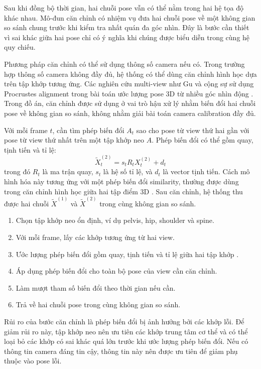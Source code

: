 \documentclass[../DoAn.tex]{subfiles}
\begin{document}
Sau khi đồng bộ thời gian, hai chuỗi pose vẫn có thể nằm trong hai hệ tọa độ khác nhau. Mô-đun căn chỉnh có nhiệm vụ đưa hai chuỗi pose về một không gian so sánh chung trước khi kiểm tra nhất quán đa góc nhìn. Đây là bước cần thiết vì sai khác giữa hai pose chỉ có ý nghĩa khi chúng được biểu diễn trong cùng hệ quy chiếu.

Phương pháp căn chỉnh có thể sử dụng thông số camera nếu có. Trong trường hợp thông số camera không đầy đủ, hệ thống có thể dùng căn chỉnh hình học dựa trên tập khớp tương ứng. Các nghiên cứu multi-view như Gu và cộng sự sử dụng Procrustes alignment trong bài toán ước lượng pose 3D từ nhiều góc nhìn động \cite{gu2024multiview}. Trong đồ án, căn chỉnh được sử dụng ở vai trò hậu xử lý nhằm biến đổi hai chuỗi pose về không gian so sánh, không nhằm giải bài toán camera calibration đầy đủ.

Với mỗi frame $t$, cần tìm phép biến đổi $A_t$ sao cho pose từ view thứ hai gần với pose từ view thứ nhất trên một tập khớp neo $A$. Phép biến đổi có thể gồm quay, tịnh tiến và tỉ lệ:
\[
\tilde{X}^{(2)}_t = s_t R_t X^{(2)}_t + d_t
\]
trong đó $R_t$ là ma trận quay, $s_t$ là hệ số tỉ lệ, và $d_t$ là vector tịnh tiến. Cách mô hình hóa này tương ứng với một phép biến đổi similarity, thường được dùng trong căn chỉnh hình học giữa hai tập điểm 3D \cite{gu2024multiview}. Sau căn chỉnh, hệ thống thu được hai chuỗi $\tilde{X}^{(1)}$ và $\tilde{X}^{(2)}$ trong cùng không gian so sánh.

\begin{enumerate}[leftmargin=*, label=\arabic*.]
    \item Chọn tập khớp neo ổn định, ví dụ pelvis, hip, shoulder và spine.
    \item Với mỗi frame, lấy các khớp tương ứng từ hai view.
    \item Ước lượng phép biến đổi gồm quay, tịnh tiến và tỉ lệ giữa hai tập khớp \cite{gu2024multiview}.
    \item Áp dụng phép biến đổi cho toàn bộ pose của view cần căn chỉnh.
    \item Làm mượt tham số biến đổi theo thời gian nếu cần.
    \item Trả về hai chuỗi pose trong cùng không gian so sánh.
\end{enumerate}

Rủi ro của bước căn chỉnh là phép biến đổi bị ảnh hưởng bởi các khớp lỗi. Để giảm rủi ro này, tập khớp neo nên ưu tiên các khớp trung tâm cơ thể và có thể loại bỏ các khớp có sai khác quá lớn trước khi ước lượng phép biến đổi. Nếu có thông tin camera đáng tin cậy, thông tin này nên được ưu tiên để giảm phụ thuộc vào pose lỗi.
\end{document}

